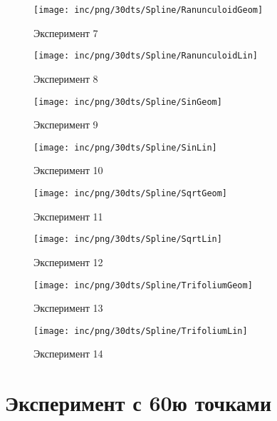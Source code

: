 \begin{figure}  
	\begin{minipage}{0,5\textwidth}
		\texttt{[image: inc/png/30dts/Spline/RanunculoidGeom]}
		\label{fig:app1}
		\caption{Эксперимент 7}
	\end{minipage}
	\begin{minipage}{0,5\textwidth}
		\texttt{[image: inc/png/30dts/Spline/RanunculoidLin]}
		\label{fig:app2}
		\caption{Эксперимент 8}
	\end{minipage}
	
	\begin{minipage}{0,5\textwidth}
		\texttt{[image: inc/png/30dts/Spline/SinGeom]}
		\label{fig:app1}
		\caption{Эксперимент 9}
	\end{minipage}
	\begin{minipage}{0,5\textwidth}
		\texttt{[image: inc/png/30dts/Spline/SinLin]}
		\label{fig:app2}
		\caption{Эксперимент 10}
	\end{minipage}
	
	\begin{minipage}{0,5\textwidth}
		\texttt{[image: inc/png/30dts/Spline/SqrtGeom]}
		\label{fig:app1}
		\caption{Эксперимент 11}
	\end{minipage}
	\begin{minipage}{0,5\textwidth}
		\texttt{[image: inc/png/30dts/Spline/SqrtLin]}
		\label{fig:app2}
		\caption{Эксперимент 12}
	\end{minipage}
	
	\begin{minipage}{0,5\textwidth}
		\texttt{[image: inc/png/30dts/Spline/TrifoliumGeom]}
		\label{fig:app1}
		\caption{Эксперимент 13}
	\end{minipage}
	\begin{minipage}{0,5\textwidth}
		\texttt{[image: inc/png/30dts/Spline/TrifoliumLin]}
		\label{fig:app2}
		\caption{Эксперимент 14}
	\end{minipage}
\end{figure}
\clearpage


\section{Эксперимент с 60ю точками}
